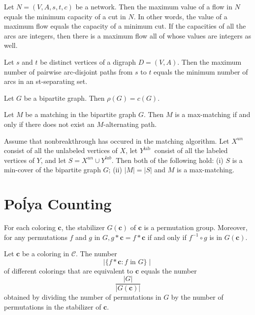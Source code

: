\begin{theorem}
  \label{thm:13.2.3}
  Let $N=(V, A, s, t, c)$ be a network. Then the maximum value of a flow in $N$ equals the minimum capacity of a cut in $N$. In other words, the value of a maximum flow equals the capacity of a minimum cut. If the capacities of all the arcs are integers, then there is a maximum flow all of whose values are integers as well.
\end{theorem}

\begin{theorem}
  \label{thm:13.2.4}
  Let $s$ and $t$ be distinct vertices of a digraph $D = (V, A)$. Then the maximum number of pairwise arc-disjoint paths from $s$ to $t$ equals the minimum number of arcs in an st-separating set.
\end{theorem}

\begin{theorem}
  \label{thm:13.2.5}
  Let $G$ be a bipartite graph. Then $\rho(G) =c(G)$.
\end{theorem}

\begin{theorem}
  \label{thm:13.3.1}
  Let $M$ be a matching in the bipartite graph $G$. Then $M$ is a max-matching if and only if there does not exist an $M$-alternating path.
\end{theorem}

\begin{theorem}
  \label{thm:13.3.2}
  Assume that nonbreakthrough has occured in the matching algorithm. Let $X^{u n}$ consist of all the unlabeled vertices of $X$, let $Y^{\text {lab }}$ consist of all the labeled vertices of $Y$, and let $S=X^{u n} \cup Y^{l a b}$. Then both of the following hold:
  (i) $S$ is a min-cover of the bipartite graph $G$;
  (ii) $|M|=|S|$ and $M$ is a max-matching.
\end{theorem}

\chapter{Po\'lya Counting}

\begin{theorem}
  \label{thm:14.2.1}
  For each coloring $\mathbf{c}$, the stabilizer $G(\mathbf{c})$ of $\mathbf{c}$ is a permutation group. Moreover, for any permutations $f$ and $g$ in $G, g * \mathbf{c}=f * \mathbf{c}$ if and only if $f^{-1} \circ g$ is in $G(\mathbf{c})$.
\end{theorem}

\begin{corollary}
  \label{cor:14.2.2}
  Let $\mathbf{c}$ be a coloring in $\mathcal{C}$. The number
  $$
  \mid\{f * \mathbf{c}: f \text { in } G\} \mid
  $$
  of different colorings that are equivalent to $\mathbf{c}$ equals the number
  $$
  \frac{|G|}{|G(\mathbf{c})|}
  $$
  obtained by dividing the number of permutations in $G$ by the number of permutations in the stabilizer of $\mathbf{c}$.
\end{corollary}

